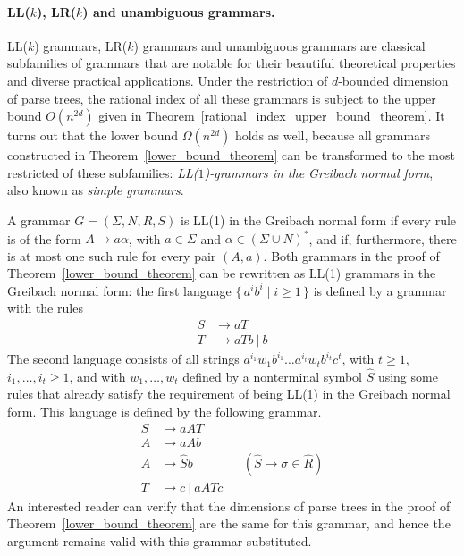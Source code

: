 \documentclass[runningheads]{llncs}
\newcommand{\set}[2]{\{ \, #1 \mid #2 \, \}}
\begin{document}
\paragraph{LL($k$), LR($k$) and unambiguous grammars.}
LL($k$) grammars, LR($k$) grammars and unambiguous grammars
are classical subfamilies of grammars
that are notable for their beautiful theoretical properties
and diverse practical applications.
Under the restriction of $d$-bounded dimension of parse trees,
the rational index of all these grammars
is subject to the upper bound $O(n^{2d})$
given in Theorem~\ref{rational_index_upper_bound_theorem}.
It turns out that the lower bound $\Omega(n^{2d})$ holds as well,
because all grammars constructed in Theorem~\ref{lower_bound_theorem}
can be transformed to the most restricted of these subfamilies:
\emph{LL($1$)-grammars in the Greibach normal form},
also known as \emph{simple grammars}.

A grammar $G = (\Sigma, N, R, S)$ is LL(1) in the Greibach normal form
if every rule is of the form $A \to a \alpha$,
with $a \in \Sigma$ and $\alpha \in (\Sigma \cup N)^*$,
and if, furthermore, there is at most one such rule for every pair $(A, a)$.
Both grammars in the proof of Theorem~\ref{lower_bound_theorem}
can be rewritten as LL(1) grammars in the Greibach normal form:
the first language $\set{a^i b^i}{i \geqslant 1}$
is defined by a grammar with the rules
\begin{align*}
	S &\to a T \\
	T &\to a T b \ | \ b
\end{align*}
The second language
consists of all strings 
$a^{i_1} w_1 b^{i_1} \ldots a^{i_t} w_t b^{i_t} c^t$,
with $t \geqslant 1$,
$i_1, \ldots, i_t \geqslant 1$,
and with $w_1, \ldots, w_t$ defined by a nonterminal symbol $\widehat{S}$
using some rules that already satisfy the requirement of being LL(1) in the Greibach normal form.
This language is defined by the following grammar.
\begin{align*}
	S &\to a A T \\
	A &\to a A b \\
	A &\to \widehat{S} b
		&& (\widehat{S} \to \sigma \in \widehat{R}) \\
	T &\to c \ | \ a A T c
\end{align*}
An interested reader can verify that the dimensions of parse trees
in the proof of Theorem~\ref{lower_bound_theorem}
are the same for this grammar,
and hence the argument remains valid with this grammar substituted.
\end{document}

